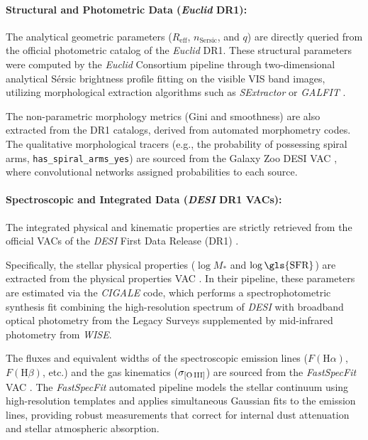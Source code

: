 \paragraph{Structural and Photometric Data (\textit{Euclid} DR1):}                                                                                                                      
	The analytical geometric parameters ($R_{\text{eff}}$, $n_{\text{Sersic}}$, and $q$) are directly queried from the official photometric catalog of the \textit{Euclid} DR1. These structural parameters were computed by the \textit{Euclid} Consortium pipeline through two-dimensional analytical Sérsic brightness profile fitting on the visible VIS band images, utilizing morphological extraction algorithms such as \textit{SExtractor} \autocite{ar:bertin-1996} or \textit{GALFIT} \autocite{ar:peng-2002}. 
	
	The non-parametric morphology metrics (Gini and smoothness) are also extracted from the DR1 catalogs, derived from automated morphometry codes. The qualitative morphological tracers (e.g., the probability of possessing spiral arms, \texttt{has\_spiral\_arms\_yes}) are sourced from the Galaxy Zoo DESI \gls{VAC} \autocite{ar:walmsley-2023}, where convolutional networks assigned probabilities to each source.
	
\paragraph{Spectroscopic and Integrated Data (\textit{DESI} DR1 VACs):} 
	The integrated physical and kinematic properties are strictly retrieved from the official \glspl{VAC} of the \textit{DESI} First Data Release (DR1) \autocite{ar:desi-early-release,ar:desi-dr1-2026,ar:siudek-2024}. 
	
	Specifically, the stellar physical properties ($\log M_*$ and $\log \text{\gls{SFR}}$) are extracted from the physical properties \gls{VAC} \autocite{ar:siudek-2024}. In their pipeline, these parameters are estimated via the \textit{CIGALE} \autocite{ar:boquien-2019} code, which performs a spectrophotometric synthesis fit combining the high-resolution spectrum of \textit{DESI} with broadband optical photometry from the Legacy Surveys \autocite{ar:dey-2019} supplemented by mid-infrared photometry from \textit{\gls{WISE}}\autocite{ar:wright-2010}.
	
	The fluxes and equivalent widths of the spectroscopic emission lines ($F(\text{H}\alpha)$, $F(\text{H}\beta)$, etc.) and the gas kinematics ($\sigma_{[\text{O\,III}]}$) are sourced from the \textit{FastSpecFit} \gls{VAC} \autocite{ar:moustakas-2023}. The \textit{FastSpecFit} automated pipeline models the stellar continuum using high-resolution templates and applies simultaneous Gaussian fits to the emission lines, providing robust measurements that correct for internal dust attenuation and stellar atmospheric absorption.

